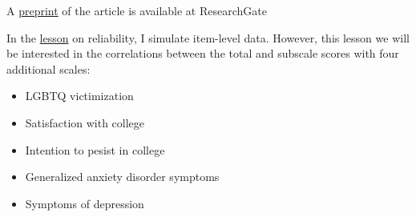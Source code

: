 \documentclass[
  english,
]{book}
\providecommand{\tightlist}{%
  \setlength{\itemsep}{0pt}\setlength{\parskip}{0pt}}
\begin{document}
A \href{https://www.researchgate.net/publication/332062781_Perceptions_of_the_LGBTQ_College_Campus_Climate_Scale_Development_and_Psychometric_Evaluation/link/5ca0bef945851506d7377da7/download}{preprint} of the article is available at ResearchGate

In the \protect\hyperlink{rxx}{lesson} on reliability, I simulate item-level data. However, this lesson we will be interested in the correlations between the total and subscale scores with four additional scales:

\begin{itemize}
\tightlist
\item
  LGBTQ victimization
\item
  Satisfaction with college
\item
  Intention to pesist in college
\item
  Generalized anxiety disorder symptoms
\item
  Symptoms of depression
\end{itemize}
\end{document}
